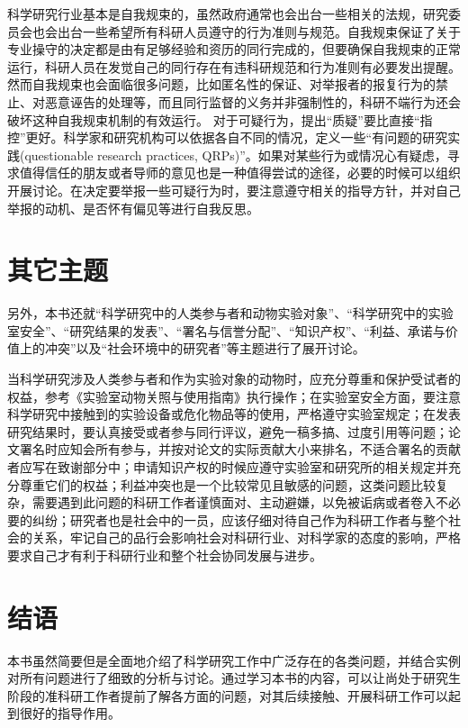 \documentclass[conference]{IEEEtran}
\begin{document}
科学研究行业基本是自我规束的，虽然政府通常也会出台一些相关的法规，研究委员会也会出台一些希望所有科研人员遵守的行为准则与规范。自我规束保证了关于专业操守的决定都是由有足够经验和资历的同行完成的，但要确保自我规束的正常运行，科研人员在发觉自己的同行存在有违科研规范和行为准则有必要发出提醒。然而自我规束也会面临很多问题，比如匿名性的保证、对举报者的报复行为的禁止、对恶意诬告的处理等，而且同行监督的义务并非强制性的，科研不端行为还会破坏这种自我规束机制的有效运行。
对于可疑行为，提出“质疑”要比直接“指控”更好。科学家和研究机构可以依据各自不同的情况，定义一些“有问题的研究实践(questionable research practices, QRPs)”。如果对某些行为或情况心有疑虑，寻求值得信任的朋友或者导师的意见也是一种值得尝试的途径，必要的时候可以组织开展讨论。在决定要举报一些可疑行为时，要注意遵守相关的指导方针，并对自己举报的动机、是否怀有偏见等进行自我反思。

\section{其它主题}

另外，本书还就“科学研究中的人类参与者和动物实验对象”、“科学研究中的实验室安全”、“研究结果的发表”、“署名与信誉分配”、“知识产权”、“利益、承诺与价值上的冲突”以及“社会环境中的研究者”等主题进行了展开讨论。

当科学研究涉及人类参与者和作为实验对象的动物时，应充分尊重和保护受试者的权益，参考《实验室动物关照与使用指南》执行操作；在实验室安全方面，要注意科学研究中接触到的实验设备或危化物品等的使用，严格遵守实验室规定；在发表研究结果时，要认真接受或者参与同行评议，避免一稿多搞、过度引用等问题；论文署名时应知会所有参与，并按对论文的实际贡献大小来排名，不适合署名的贡献者应写在致谢部分中；申请知识产权的时候应遵守实验室和研究所的相关规定并充分尊重它们的权益；利益冲突也是一个比较常见且敏感的问题，这类问题比较复杂，需要遇到此问题的科研工作者谨慎面对、主动避嫌，以免被诟病或者卷入不必要的纠纷；研究者也是社会中的一员，应该仔细对待自己作为科研工作者与整个社会的关系，牢记自己的品行会影响社会对科研行业、对科学家的态度的影响，严格要求自己才有利于科研行业和整个社会协同发展与进步。

\section{结语}

本书虽然简要但是全面地介绍了科学研究工作中广泛存在的各类问题，并结合实例对所有问题进行了细致的分析与讨论。通过学习本书的内容，可以让尚处于研究生阶段的准科研工作者提前了解各方面的问题，对其后续接触、开展科研工作可以起到很好的指导作用。




\end{document}
